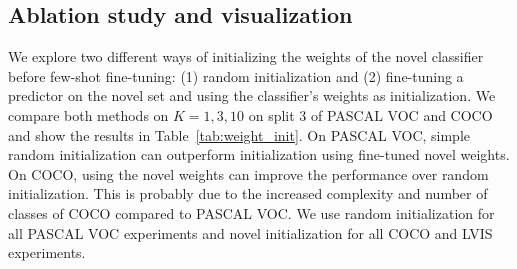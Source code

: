 

\subsection{Ablation study and visualization}
\label{sec:vis}

We explore two different ways of initializing the weights of the novel classifier before few-shot fine-tuning: (1) random initialization and (2) fine-tuning a predictor on the novel set and using the classifier's weights as initialization. We compare both methods on $K=1,3,10$ on split 3 of PASCAL VOC and COCO and show the results in Table~\ref{tab:weight_init}. 
On PASCAL VOC, simple random initialization can outperform initialization using fine-tuned novel weights. On COCO, using the novel weights can improve the performance over random initialization. This is probably due to the increased complexity and number of classes of COCO compared to PASCAL VOC. We use random initialization for all PASCAL VOC experiments and novel initialization for all COCO and LVIS experiments.

